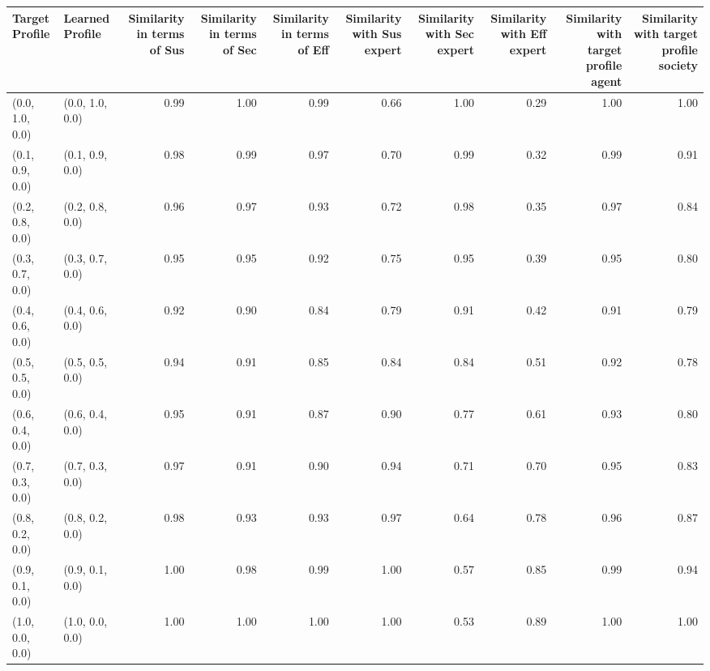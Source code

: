\begin{tabular}{llrrrrrrrr}
\toprule
Target Profile & Learned Profile & Similarity in terms of Sus & Similarity in terms of Sec & Similarity in terms of Eff & Similarity with Sus expert & Similarity with Sec expert & Similarity with Eff expert & Similarity with target profile agent & Similarity with target profile society \\
\midrule
(0.0, 1.0, 0.0) & (0.0, 1.0, 0.0) & 0.99 & 1.00 & 0.99 & 0.66 & 1.00 & 0.29 & 1.00 & 1.00 \\
(0.1, 0.9, 0.0) & (0.1, 0.9, 0.0) & 0.98 & 0.99 & 0.97 & 0.70 & 0.99 & 0.32 & 0.99 & 0.91 \\
(0.2, 0.8, 0.0) & (0.2, 0.8, 0.0) & 0.96 & 0.97 & 0.93 & 0.72 & 0.98 & 0.35 & 0.97 & 0.84 \\
(0.3, 0.7, 0.0) & (0.3, 0.7, 0.0) & 0.95 & 0.95 & 0.92 & 0.75 & 0.95 & 0.39 & 0.95 & 0.80 \\
(0.4, 0.6, 0.0) & (0.4, 0.6, 0.0) & 0.92 & 0.90 & 0.84 & 0.79 & 0.91 & 0.42 & 0.91 & 0.79 \\
(0.5, 0.5, 0.0) & (0.5, 0.5, 0.0) & 0.94 & 0.91 & 0.85 & 0.84 & 0.84 & 0.51 & 0.92 & 0.78 \\
(0.6, 0.4, 0.0) & (0.6, 0.4, 0.0) & 0.95 & 0.91 & 0.87 & 0.90 & 0.77 & 0.61 & 0.93 & 0.80 \\
(0.7, 0.3, 0.0) & (0.7, 0.3, 0.0) & 0.97 & 0.91 & 0.90 & 0.94 & 0.71 & 0.70 & 0.95 & 0.83 \\
(0.8, 0.2, 0.0) & (0.8, 0.2, 0.0) & 0.98 & 0.93 & 0.93 & 0.97 & 0.64 & 0.78 & 0.96 & 0.87 \\
(0.9, 0.1, 0.0) & (0.9, 0.1, 0.0) & 1.00 & 0.98 & 0.99 & 1.00 & 0.57 & 0.85 & 0.99 & 0.94 \\
(1.0, 0.0, 0.0) & (1.0, 0.0, 0.0) & 1.00 & 1.00 & 1.00 & 1.00 & 0.53 & 0.89 & 1.00 & 1.00 \\
\bottomrule
\end{tabular}
